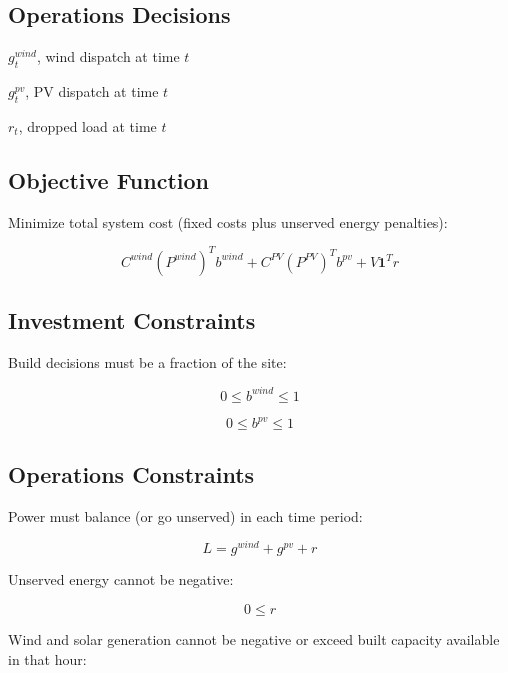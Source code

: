 \documentclass[11pt]{article}
\begin{document}
\subsection{Operations Decisions}

$g^{wind}_{t}$, wind dispatch at time $t$

$g^{pv}_{t}$, PV dispatch at time $t$

$r_t$, dropped load at time $t$

\subsection{Objective Function}

Minimize total system cost (fixed costs plus unserved energy penalties):

\begin{equation}
C^{wind} (P^{wind})^T b^{wind} + C^{PV} (P^{PV})^T b^{pv} + V \mathbf{1}^T r
\end{equation}

\subsection{Investment Constraints}

Build decisions must be a fraction of the site:

\begin{equation}
    0 \leq b^{wind} \leq 1
\end{equation}

\begin{equation}
    0 \leq b^{pv} \leq 1	
\end{equation}

\subsection{Operations Constraints}

Power must balance (or go unserved) in each time period:

\begin{equation}
	L = g^{wind} + g^{pv} + r
\end{equation}

Unserved energy cannot be negative:

\begin{equation}
    0 \leq r	
\end{equation}

Wind and solar generation cannot be negative or exceed built capacity available in that hour:
\end{document}
